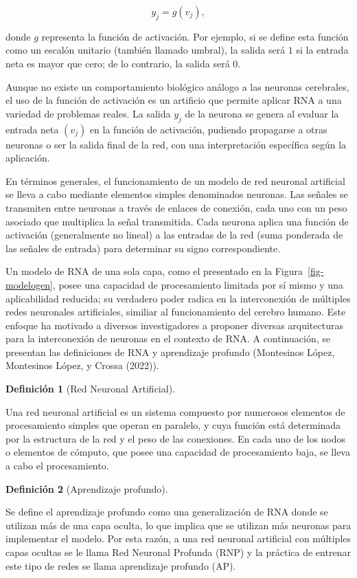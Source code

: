 \documentclass[
  us-letterpaper,
]{scrreprt}
\theoremstyle{plain}
\theoremstyle{definition}
\newtheorem{definition}{Definición}[chapter]
\theoremstyle{definition}
\theoremstyle{plain}
\theoremstyle{remark}
\begin{document}
\[
y_j=g(v_j),
\]

donde \(g\) representa la función de activación. Por ejemplo, si se
define esta función como un escalón unitario (también llamado umbral),
la salida será \(1\) si la entrada neta es mayor que cero; de lo
contrario, la salida será \(0\).

Aunque no existe un comportamiento biológico análogo a las neuronas
cerebrales, el uso de la función de activación es un artificio que
permite aplicar RNA a una variedad de problemas reales. La salida
\(y_j\) de la neurona se genera al evaluar la entrada neta \((v_j)\) en
la función de activación, pudiendo propagarse a otras neuronas o ser la
salida final de la red, con una interpretación específica según la
aplicación.

En términos generales, el funcionamiento de un modelo de red neuronal
artificial se lleva a cabo mediante elementos simples denominados
neuronas. Las señales se transmiten entre neuronas a través de enlaces
de conexión, cada uno con un peso asociado que multiplica la señal
transmitida. Cada neurona aplica una función de activación (generalmente
no lineal) a las entradas de la red (suma ponderada de las señales de
entrada) para determinar su signo correspondiente.

Un modelo de RNA de una sola capa, como el presentado en la
Figura~\ref{fig-modelogen}, posee una capacidad de procesamiento
limitada por sí mismo y una aplicabilidad reducida; su verdadero poder
radica en la interconexión de múltiples redes neuronales artificiales,
similiar al funcionamiento del cerebro humano. Este enfoque ha motivado
a diversos investigadores a proponer diversas arquitecturas para la
interconexión de neuronas en el contexto de RNA. A continuación, se
presentan las definiciones de RNA y aprendizaje profundo (Montesinos
López, Montesinos López, y Crossa (2022)).

\begin{definition}[Red Neuronal
Artificial]\protect\hypertarget{def-ANN}{}\label{def-ANN}

Una red neuronal artificial es un sistema compuesto por numerosos
elementos de procesamiento simples que operan en paralelo, y cuya
función está determinada por la estructura de la red y el peso de las
conexiones. En cada uno de los nodos o elementos de cómputo, que posee
una capacidad de procesamiento baja, se lleva a cabo el procesamiento.

\end{definition}

\begin{definition}[Aprendizaje
profundo]\protect\hypertarget{def-AP}{}\label{def-AP}

Se define el aprendizaje profundo como una generalización de RNA donde
se utilizan más de una capa oculta, lo que implica que se utilizan más
neuronas para implementar el modelo. Por esta razón, a una red neuronal
artificial con múltiples capas ocultas se le llama Red Neuronal Profunda
(RNP) y la práctica de entrenar este tipo de redes se llama aprendizaje
profundo (AP).

\end{definition}
\end{document}
